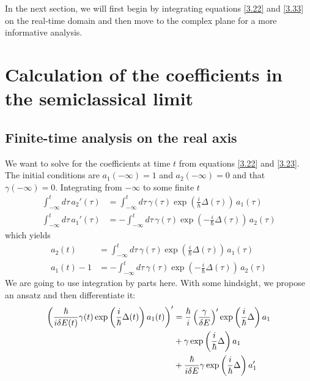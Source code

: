 \documentclass[12pt,a4paper]{article}
\begin{document}
	In the next section, we will first begin by integrating equations \eqref{3.22} and \eqref{3.33} on the real-time domain and then move to the complex plane for a more informative analysis. 
	
	\section{Calculation of the coefficients in the semiclassical limit}
	\label{sec:calculation}
	
	\subsection{Finite-time analysis on the real axis} \label{subsec:real analysis}
	
	We want to solve for the coefficients at time $t$ from equations \eqref{3.22} and \eqref{3.23}. The initial conditions are $a_{1}(-\infty) = 1$ and $a_{2}(-\infty) = 0$ and that $\gamma(-\infty) = 0$. Integrating from $-\infty$ to some finite $t$	
	\begin{align}
		\int_{-\infty}^{t} d\tau \, a_{2}'(\tau) &= \int_{-\infty}^{t} d\tau \, \gamma(\tau) \exp\left( \frac{i}{\hbar} \Delta(\tau) \right) \, a_{1}(\tau) \\[5pt]
		\int_{-\infty}^{t} d\tau \, a_{1}'(\tau) &= -\int_{-\infty}^{t} d\tau \, \gamma(\tau) \exp\left( -\frac{i}{\hbar} \Delta(\tau) \right) \, a_{2}(\tau)
	\end{align}
	which yields
	\begin{align}
		a_{2}(t) &= \int_{-\infty}^{t} d\tau \, \gamma(\tau) \exp\left( \frac{i}{\hbar} \Delta(\tau) \right) \, a_{1}(\tau) \label{4.3} \\[5pt]
		a_{1}(t) - 1 &= -\int_{-\infty}^{t} d\tau \, \gamma(\tau) \exp\left( -\frac{i}{\hbar} \Delta(\tau) \right) \, a_{2}(\tau) \label{4.4}
	\end{align}
	We are going to use integration by parts here. With some hindsight, we propose an ansatz and then differentiate it:
	\begin{align}
		\left( \dfrac{\hbar}{i \delta E(t)} \gamma(t) \exp\left( \dfrac{i}{\hbar} \Delta(t) \right) a_{1}(t) \right)' &= \dfrac{\hbar}{i} \left( \dfrac{\gamma}{\delta E} \right)' \exp\left( \dfrac{i}{\hbar} \Delta \right) a_{1} \notag \\ 
		&+ \gamma \exp\left( \dfrac{i}{\hbar} \Delta \right) a_{1} \notag \\
		&+ \dfrac{\hbar}{i \delta E} \gamma \exp\left( \dfrac{i}{\hbar} \Delta \right) a_{1}' \label{4.5}
	\end{align}
\end{document}
